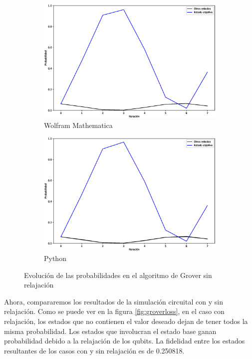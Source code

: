 \begin{figure}[H]
    \centering
    \begin{subfigure}[m]{0.49\textwidth}
        \centering
        \includegraphics[width=0.9\linewidth]{img/groverallM.eps}
        \caption{Wolfram Mathematica}
    \end{subfigure}
    \begin{subfigure}[m]{0.49\textwidth}
        \centering
        \includegraphics[width=0.9\linewidth]{img/groveralllossless.eps}
        \caption{Python}
    \end{subfigure}
    \caption[Evolución de las probabilidades en el algoritmo de Grover sin relajación]{Evolución de las probabilidades en el algoritmo de Grover sin relajación}
    \label{fig:groverlosslesscomp1111}
\end{figure}

Ahora, compararemos los resultados de la simulación circuital con y sin relajación. Como se puede ver en la figura \ref{fig:groverloss}, en el caso con relajación, los estados que no contienen el valor deseado dejan de tener todos la misma probabilidad. Los estados que involucran el estado base ganan probabilidad debido a la relajación de los qubits. La fidelidad entre los estados resultantes de los casos con y sin relajación es de 0.250818.


